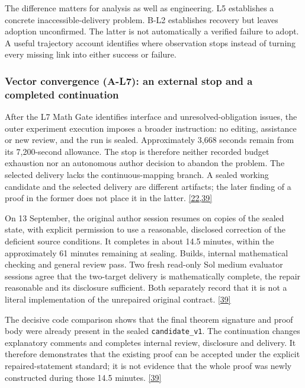 The difference matters for analysis as well as engineering. L5 establishes a concrete inaccessible-delivery problem. B-L2 establishes recovery but leaves adoption unconfirmed. The latter is not automatically a verified failure to adopt. A useful trajectory account identifies where observation stops instead of turning every missing link into either success or failure.

\subsubsection[Vector convergence (A-L7): an external stop and a completed continuation]{\texorpdfstring{\protect\hypertarget{r2-6}{}Vector convergence (A-L7): an external stop and a completed continuation}{Vector convergence (A-L7): an external stop and a completed continuation}}
After the L7 Math Gate identifies interface and unresolved-obligation issues, the outer experiment execution imposes a broader instruction: no editing, assistance or new review, and the run is sealed. Approximately 3,668 seconds remain from its 7,200-second allowance. The stop is therefore neither recorded budget exhaustion nor an autonomous author decision to abandon the problem. The selected delivery lacks the continuous-mapping branch. A sealed working candidate and the selected delivery are different artifacts; the later finding of a proof in the former does not place it in the latter. \href{en.pdf\#ref-22}{\mbox{[22,39]}}

On 13 September, the original author session resumes on copies of the sealed state, with explicit permission to use a reasonable, disclosed correction of the deficient source conditions. It completes in about 14.5 minutes, within the approximately 61 minutes remaining at sealing. Builds, internal mathematical checking and general review pass. Two fresh read-only Sol medium evaluator sessions agree that the two-target delivery is mathematically complete, the repair reasonable and its disclosure sufficient. Both separately record that it is not a literal implementation of the unrepaired original contract. \href{en.pdf\#ref-39}{\mbox{[39]}}

The decisive code comparison shows that the final theorem signature and proof body were already present in the sealed \nolinkurl{candidate_v1}. The continuation changes explanatory comments and completes internal review, disclosure and delivery. It therefore demonstrates that the existing proof can be accepted under the explicit repaired-statement standard; it is not evidence that the whole proof was newly constructed during those 14.5 minutes. \href{en.pdf\#ref-39}{\mbox{[39]}}

